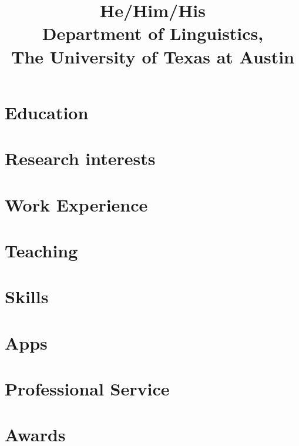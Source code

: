 \documentclass[11pt,a4paper]{mycv}
\title{He/Him/His\\Department of Linguistics,\\The University of Texas at Austin}
\begin{document}
\makecvtitle


\section{Education}


\section{Research interests}


\section{Work Experience}


\begingroup
\setlength\bibitemsep{0.5ex}
\printbibliography[title=Papers, nottype=unpublished]
\endgroup

\begingroup
\setlength\bibitemsep{0.5ex}
\printbibliography[title=Talks, type=unpublished]
\endgroup

\section{Teaching}


\section{Skills}


\section{Apps}


\newpage

\section{Professional Service}


\section{Awards}

\end{document}
